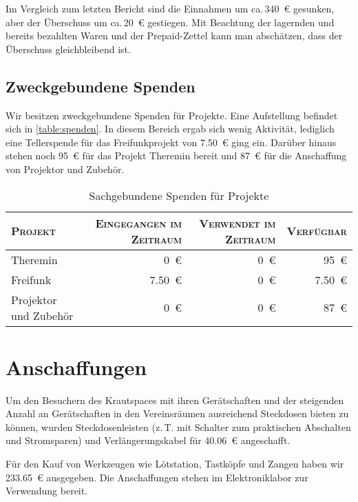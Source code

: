 \documentclass[ngerman]{scrartcl}
\begin{document}
Im Vergleich zum letzten Bericht sind die Einnahmen um ca.\,\num{340}~\euro{} gesunken, aber der Überschuss um ca.\,\num{20}~\euro{} gestiegen.
Mit Beachtung der lagernden und bereits bezahlten Waren und der Prepaid-Zettel kann man abschätzen, dass der Überschuss gleichbleibend ist.

\subsection{Zweckgebundene Spenden}
\label{sec:zweckgebundene_spenden}

Wir besitzen zweckgebundene Spenden für Projekte. Eine Aufstellung befindet sich in \autoref{table:spenden}.
In diesem Bereich ergab sich wenig Aktivität, lediglich eine Tellerspende für das Freifunkprojekt von \num{7,50}~\euro{} ging ein. Darüber hinaus stehen noch \num{95}~\euro{} für das Projekt Theremin bereit und
\num{87}~\euro{} für die Anschaffung von Projektor und Zubehör.

\begin{table}[h]
	\centering
	\begin{tabular}{l|r|r|r}
          \toprule
	\textsc{Projekt} & \textsc{Eingegangen im Zeitraum} & \textsc{Verwendet im Zeitraum} & \textsc{Verfügbar} \\ \midrule
	Theremin & \num{0}~\euro{} & \num{0}~\euro{} & \num{95}~\euro{} \\
	Freifunk & \num{7,50}~\euro{} & \num{0}~\euro{} & \num{7,50}~\euro{} \\
	Projektor und Zubehör & \num{0}~\euro{} & \num{0}~\euro{} & \num{87}~\euro{} \\
\bottomrule
	\end{tabular}
	\caption{Sachgebundene Spenden für Projekte}
	\label{table:spenden}
\end{table}

\section{Anschaffungen}
\label{sec:anschaffungen}
Um den Besuchern des Krautspaces mit ihren Gerätschaften und der steigenden Anzahl an Gerätschaften in den Vereinsräumen ausreichend Steckdosen bieten zu können, wurden Steckdosenleisten (z.\,T. mit Schalter zum praktischen Abschalten und Stromsparen) und Verlängerungskabel für \num{40,06}~\euro{} angeschafft.

Für den Kauf von Werkzeugen wie Lötstation, Tastköpfe und Zangen haben wir \num{233,65}~\euro{} ausgegeben.
Die Anschaffungen stehen im Elektroniklabor zur Verwendung bereit.
\end{document}
